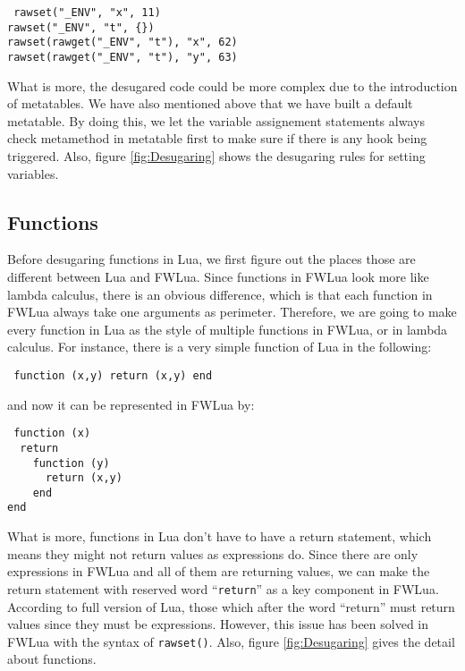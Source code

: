 \documentclass{article}
\begin{document}
\begin{flushleft}
{\tt
rawset("\_ENV", "x", 11)\\
rawset("\_ENV", "t", \{\})\\
rawset(rawget("\_ENV", "t"), "x", 62)\\
rawset(rawget("\_ENV", "t"), "y", 63)\\
}
\end{flushleft}

What is more, the desugared code could be more complex due to the introduction of metatables. We have also mentioned above that we have built a default metatable. By doing this, we let the variable assignement statements always check metamethod in metatable first to make sure if there is any hook being triggered. Also, figure \ref{fig:Desugaring} shows the desugaring rules for setting variables.

\subsection{Functions}
Before desugaring functions in Lua, we first figure out the places those are different between Lua and FWLua. Since functions in FWLua look more like lambda calculus, there is an obvious difference, which is that each function in FWLua always take one arguments as perimeter. Therefore, we are going to make every function in Lua as the style of multiple functions in FWLua, or in lambda calculus. For instance, there is a very simple function of Lua in the following:
\begin{flushleft}
{\tt
function (x,y) return (x,y) end
}
\end{flushleft}
and now it can be represented in FWLua by:
\begin{flushleft}
{\tt
function (x) \\
~~return \\
~~~~function (y) \\
~~~~~~return (x,y) \\
~~~~end \\
end \\
}
\end{flushleft}

What is more, functions in Lua don't have to have a return statement, which means they might not return values as expressions do. Since there are only expressions in FWLua and all of them are returning values, we can make the return statement with reserved word ``{\tt return}'' as a key component in FWLua. According to full version of Lua, those which after the word ``return'' must return values since they must be expressions. However, this issue has been solved in FWLua with the syntax of {\tt rawset()}. Also, figure \ref{fig:Desugaring} gives the detail about functions.
\end{document}
